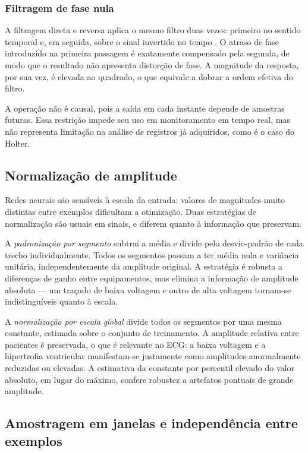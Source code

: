 \subsubsection{Filtragem de fase nula}
\label{subsubsec:fund-fase-nula}

A filtragem direta e reversa aplica o mesmo filtro duas vezes: primeiro no
sentido temporal e, em seguida, sobre o sinal invertido no tempo
\cite{gustafsson1996determining}. O atraso de fase introduzido na primeira
passagem é exatamente compensado pela segunda, de modo que o resultado não
apresenta distorção de fase. A magnitude da resposta, por sua vez, é elevada
ao quadrado, o que equivale a dobrar a ordem efetiva do filtro.

A operação não é causal, pois a saída em cada instante depende de amostras
futuras. Essa restrição impede seu uso em monitoramento em tempo real, mas não
representa limitação na análise de registros já adquiridos, como é o caso do
Holter.

\subsection{Normalização de amplitude}
\label{subsec:fund-normalizacao}

Redes neurais são sensíveis à escala da entrada: valores de magnitudes muito
distintas entre exemplos dificultam a otimização. Duas estratégias de
normalização são usuais em sinais, e diferem quanto à informação que
preservam.

A \textit{padronização por segmento} subtrai a média e divide pelo
desvio-padrão de cada trecho individualmente. Todos os segmentos passam a ter
média nula e variância unitária, independentemente da amplitude original. A
estratégia é robusta a diferenças de ganho entre equipamentos, mas elimina a
informação de amplitude absoluta --- um traçado de baixa voltagem e outro de
alta voltagem tornam-se indistinguíveis quanto à escala.

A \textit{normalização por escala global} divide todos os segmentos por uma
mesma constante, estimada sobre o conjunto de treinamento. A amplitude
relativa entre pacientes é preservada, o que é relevante no \gls{ECG}: a baixa
voltagem e a hipertrofia ventricular manifestam-se justamente como amplitudes
anormalmente reduzidas ou elevadas. A estimativa da constante por percentil
elevado do valor absoluto, em lugar do máximo, confere robustez a artefatos
pontuais de grande amplitude.

\subsection{Amostragem em janelas e independência entre exemplos}
\label{subsec:fund-janelas}

